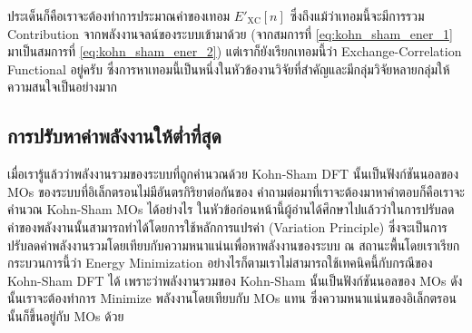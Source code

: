 ประเด็นก็คือเราจะต้องทำการประมาณค่าของเทอม ${E'}_{\text{XC}}[n]$ ซึ่งถึงแม้ว่าเทอมนี้จะมีการรวม Contribution จากพลังงานจลน์ของระบบเข้ามาด้วย (จากสมการที่ \eqref{eq:kohn_sham_ener_1} มาเป็นสมการที่ \eqref{eq:kohn_sham_ener_2}) แต่เราก็ยังเรียกเทอมนี้ว่า Exchange-Correlation Functional อยู่ครับ ซึ่งการหาเทอมนี้เป็นหนึ่งในหัวข้องานวิจัยที่สำคัญและมีกลุ่มวิจัยหลายกลุ่มให้ความสนใจเป็นอย่างมาก

\subsection{การปรับหาค่าพลังงานให้ต่ำที่สุด}
\label{ssec:kohn_sham_ener_minimize}

เมื่อเรารู้แล้วว่าพลังงานรวมของระบบที่ถูกคำนวณด้วย Kohn-Sham DFT นั้นเป็นฟังก์ชันนอลของ MOs ของระบบที่อิเล็กตรอนไม่มีอันตรกิริยาต่อกันของ คำถามต่อมาที่เราจะต้องมาหาคำตอบก็คือเราจะคำนวณ Kohn-Sham MOs ได้อย่างไร ในหัวข้อก่อนหน้านี้ผู้อ่านได้ศึกษาไปแล้วว่าในการปรับลดค่าของพลังงานนั้นสามารถทำได้โดยการใช้หลักการแปรค่า (Variation Principle) ซึ่งจะเป็นการปรับลดค่าพลังงานรวมโดยเทียบกับความหนาแน่นเพื่อหาพลังงานของระบบ ณ สถานะพื้นโดยเราเรียกกระบวนการนี้ว่า Energy Minimization อย่างไรก็ตามเราไม่สามารถใช้เทคนิคนี้กับกรณีของ Kohn-Sham DFT ได้ เพราะว่าพลังงานรวมของ Kohn-Sham นั้นเป็นฟังก์ชันนอลของ MOs ดังนั้นเราจะต้องทำการ Minimize พลังงานโดยเทียบกับ MOs แทน ซึ่งความหนาแน่นของอิเล็กตรอนนั้นก็ขึ้นอยู่กับ MOs ด้วย

